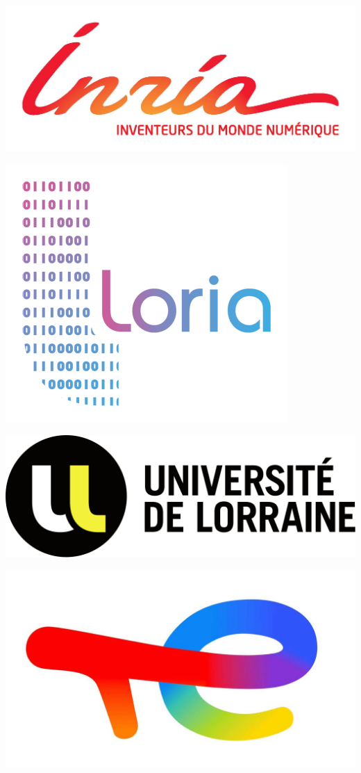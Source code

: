 \documentclass{beamer}
\begin{document}
\begin{frame}
{    \vspace{.3cm}
    \begin{minipage}{.195\textwidth}
        \centering
        \includegraphics[width=.8\linewidth]{img/new_images/inria.jpg}
    \end{minipage}%
    \begin{minipage}{.195\textwidth}
        \centering
        \includegraphics[width=.6\linewidth]{img/new_images/loria.png}
    \end{minipage}%
    \begin{minipage}{.195\textwidth}
        \centering
        \includegraphics[width=.8\linewidth]{img/new_images/UL.png}
    \end{minipage}%
    \begin{minipage}{.195\textwidth}
        \centering
        \includegraphics[width=.6\linewidth]{img/new_images/total_energies.jpg}

\end{minipage}}
\end{frame}
\end{document}
